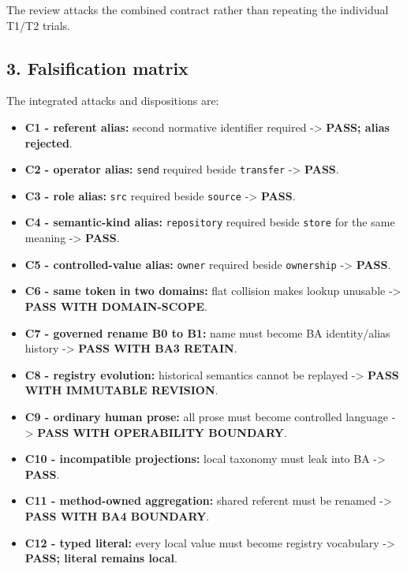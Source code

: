 \documentclass[
  10pt,
  a4paper,
]{article}
\providecommand{\tightlist}{%
  \setlength{\itemsep}{0pt}\setlength{\parskip}{0pt}}
\begin{document}
The review attacks the combined contract rather than repeating the
individual T1/T2 trials.

\subsection{3. Falsification matrix}\label{3-falsification-matrix}

The integrated attacks and dispositions are:

\begin{itemize}
\tightlist
\item
  \textbf{C1 - referent alias:} second normative identifier required
  -\textgreater{} \textbf{PASS; alias rejected}.
\item
  \textbf{C2 - operator alias:} \texttt{send} required beside
  \texttt{transfer} -\textgreater{} \textbf{PASS}.
\item
  \textbf{C3 - role alias:} \texttt{src} required beside \texttt{source}
  -\textgreater{} \textbf{PASS}.
\item
  \textbf{C4 - semantic-kind alias:} \texttt{repository} required beside
  \texttt{store} for the same meaning -\textgreater{} \textbf{PASS}.
\item
  \textbf{C5 - controlled-value alias:} \texttt{owner} required beside
  \texttt{ownership} -\textgreater{} \textbf{PASS}.
\item
  \textbf{C6 - same token in two domains:} flat collision makes lookup
  unusable -\textgreater{} \textbf{PASS WITH DOMAIN-SCOPE}.
\item
  \textbf{C7 - governed rename B0 to B1:} name must become BA
  identity/alias history -\textgreater{} \textbf{PASS WITH BA3 RETAIN}.
\item
  \textbf{C8 - registry evolution:} historical semantics cannot be
  replayed -\textgreater{} \textbf{PASS WITH IMMUTABLE REVISION}.
\item
  \textbf{C9 - ordinary human prose:} all prose must become controlled
  language -\textgreater{} \textbf{PASS WITH OPERABILITY BOUNDARY}.
\item
  \textbf{C10 - incompatible projections:} local taxonomy must leak into
  BA -\textgreater{} \textbf{PASS}.
\item
  \textbf{C11 - method-owned aggregation:} shared referent must be
  renamed -\textgreater{} \textbf{PASS WITH BA4 BOUNDARY}.
\item
  \textbf{C12 - typed literal:} every local value must become registry
  vocabulary -\textgreater{} \textbf{PASS; literal remains local}.

\end{itemize}
\end{document}
